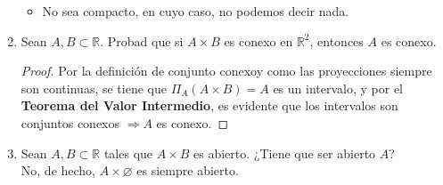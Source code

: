 \documentclass[a4paper, 11pt]{article} %
\let\emptyset\varnothing
\begin{document}
\begin{enumerate}
\begin{itemize}
		\item No sea compacto, en cuyo caso, no podemos decir nada.
	\end{itemize}
	\item Sean $A,B \subset \mathbb{R}$. Probad que si $A \times B$ es conexo en $\mathbb{R}^2$, entonces $A$ es conexo.
	\begin{proof}
		Por la definición de conjunto conexo\footnotemark[11] y como las proyecciones siempre son continuas, se tiene que $\Pi_A(A \times B) = A$ es un intervalo, y por el \textbf{Teorema del Valor Intermedio}\footnotemark[12], es evidente que los intervalos son conjuntos conexos $\Rightarrow A$ es conexo.
	\end{proof}
	\item Sean $A,B \subset \mathbb{R}$ tales que $A \times B$ es abierto. ¿Tiene que ser abierto $A$?\\

	No, de hecho, $A \times \emptyset$ es siempre abierto.
\end{enumerate}
\end{document}
